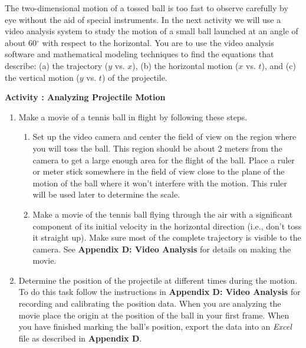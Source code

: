 The two-dimensional motion of a tossed ball is too fast to observe carefully
by eye without the aid of special instruments. In the next activity we will
use a video analysis system to study the motion of a small ball launched at
an angle of about 60\( ^{\circ } \) with respect to the horizontal. You are
to use the video analysis software and mathematical modeling techniques to find
the equations that describe: (a) the trajectory ($y$ vs. $x$), 
(b) the horizontal
motion ($x$ vs. $t$), and (c) the vertical motion ($y$ vs. 
$t$) of the projectile.

\newpage

\textbf{Activity : Analyzing Projectile Motion} 

\begin{enumerate}

\item Make a movie of a tennis ball in flight by following these steps. 

\begin{enumerate}
\item Set up the video camera and center the field of view on the region where you
will toss the ball. This region should be about 2 meters from the camera to
get a large enough area for the flight of the ball. Place a ruler or meter stick
somewhere in the field of view close to the plane of the motion of the ball
where it won't interfere with the motion. This ruler will be used later to determine
the scale. 
\item Make a movie of the tennis ball flying through the air with a significant component
of its initial velocity in the horizontal direction (i.e., don't toss it straight
up). Make sure most of the complete trajectory is visible to the camera. See
\textbf{Appendix D: Video Analysis} for details on making the movie. 

\end{enumerate}

\item Determine the position of the projectile at different times during the motion.
To do this task follow the instructions in \textbf{Appendix
D: Video Analysis} for recording and calibrating the position data. When you
are analyzing the movie place the origin at the position of the ball in your
first frame. 
When you have finished marking the ball's position, export the data into
an \textit{Excel} file as described in \textbf{Appendix D}.


\end{enumerate}
